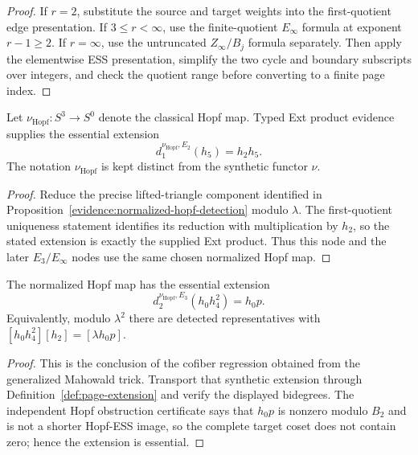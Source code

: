 \begin{proof}
  If $r=2$, substitute the source and target weights into the first-quotient
  edge presentation.  If $3\le r<\infty$, use the finite-quotient
  $E_\infty$ formula at exponent $r-1\ge2$.  If $r=\infty$, use the
  untruncated $Z_\infty/B_j$ formula separately.  Then apply the elementwise ESS presentation,
  simplify the two cycle and boundary subscripts over integers, and check the
  quotient range before converting to a finite page index.
\end{proof}

\begin{proposition}
  \label{prop:hopf-e2-page-extension}
  \notready
  Let $\nu_{\mathrm{Hopf}}:S^3\to S^0$ denote the classical Hopf map.  Typed Ext
  product evidence supplies the essential extension
  \[
    d_1^{\nu_{\mathrm{Hopf}},E_2}(h_5)=h_2h_5.
  \]
  The notation $\nu_{\mathrm{Hopf}}$ is kept distinct from the synthetic functor
  $\nu$.
\end{proposition}

\begin{proof}
  Reduce the precise lifted-triangle component identified in
  Proposition~\ref{evidence:normalized-hopf-detection} modulo $\lambda$.
  The first-quotient uniqueness statement identifies its reduction with
  multiplication by $h_2$, so the stated extension is exactly the supplied
  Ext product.  Thus this node and the later $E_3/E_\infty$ nodes use the same
  chosen normalized Hopf map.
\end{proof}

\begin{proposition}
  \label{prop:hopf-e3-page-extension}
  \notready
  The normalized Hopf map has the essential extension
  \[
    d_2^{\nu_{\mathrm{Hopf}},E_3}(h_0h_4^2)=h_0p.
  \]
  Equivalently, modulo $\lambda^2$ there are detected representatives with
  $[h_0h_4^2][h_2]=[\lambda h_0p]$.
\end{proposition}

\begin{proof}
  This is the conclusion of the cofiber regression obtained from the
  generalized Mahowald trick.  Transport that synthetic extension through
  Definition~\ref{def:page-extension} and verify the displayed bidegrees.  The
  independent Hopf obstruction certificate says that $h_0p$ is nonzero modulo
  $B_2$ and is not a shorter Hopf-ESS image, so the complete target coset does
  not contain zero; hence the extension is essential.
\end{proof}

